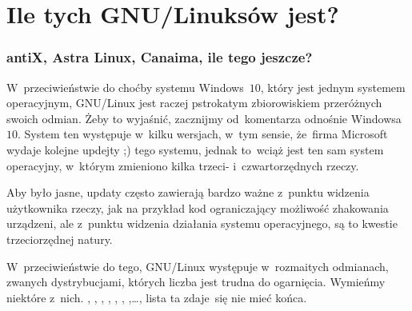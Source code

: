 \documentclass[10pt,t]{beamer}
\begin{document}
\section{Ile tych GNU/Linuksów jest?}


\begin{frame}
  \frametitle{antiX, Astra Linux, Canaima, ile tego jeszcze?}


  W~przeciwieństwie do choćby systemu Windows~$10$, który jest jednym
  systemem operacyjnym, GNU/Linux jest raczej pstrokatym zbiorowiskiem
  przeróżnych swoich odmian. Żeby to wyjaśnić, zacznijmy od~komentarza
  odnośnie Windowsa~$10$. System ten występuje w~kilku wersjach, w~tym
  sensie, że~firma Microsoft wydaje kolejne updejty ;) tego systemu, jednak
  to~wciąż jest ten sam system operacyjny, w~którym zmieniono kilka trzeci-
  i~czwartorzędnych rzeczy.

  Aby było jasne, updaty często zawierają bardzo ważne z~punktu widzenia
  użytkownika rzeczy, jak na przykład kod ograniczający możliwość
  zhakowania urządzeni, ale z~punktu widzenia działania systemu
  operacyjnego, są to kwestie trzeciorzędnej natury.

  W~przeciwieństwie do tego, GNU/Linux występuje w~rozmaitych odmianach,
  zwanych \alert{dystrybucjami}, których liczba jest trudna do ogarnięcia.
  Wymieńmy niektóre z~nich.
  ,
  ,
  ,
  ,
  ,
  ,
  ,\ldots, lista ta zdaje~się
  nie mieć końca.

\end{frame}
\end{document}
